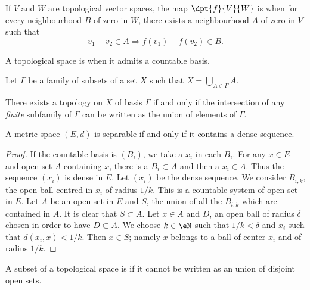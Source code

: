 \begin{definition}

	If $V$ and $W$ are topological vector spaces, the map $\dpt{f}{V}{W}$ is  when for every neighbourhood $B$ of zero in $W$, there exists a neighbourhood $A$ of zero in $V$ such that
	\[
		v_1-v_2\in A\Rightarrow f(v_1)-f(v_2)\in B.
	\]
	\label{def:unif_cont}
\end{definition}


\begin{definition}
	A topological space is  when it admits a countable basis.
\end{definition}

\begin{lemma}
	Let $\Gamma$ be a family of subsets of a set $X$ such that $X=\bigcup_{A\in\Gamma}A$.

	There exists a topology on $X$ of basis $\Gamma$ if and only if the intersection of any \emph{finite} subfamily of $\Gamma$ can be written as the union of elements of $\Gamma$.
	\label{lem:topo_base}
\end{lemma}

\begin{lemma}
	A metric space $(E,d)$ is separable if and only if it contains a dense sequence.
	\label{lem:sep_metric}
\end{lemma}

\begin{proof}
	 If the countable basis is $(B_i)$, we take a $x_i$ in each $B_i$. For any $x\in E$ and open set $A$ containing $x$, there is a $B_i\subset A$ and then a $x_i\in A$. Thus the sequence $(x_i)$ is dense in $E$.
	Let $(x_i)$ be the dense sequence. We consider $B_{i,k}$, the open ball centred in $x_i$ of radius $1/k$. This is a countable system of open set in $E$. Let $A$ be an open set in $E$ and $S$, the union of all the $B_{i,k}$ which are contained in $A$. It is clear that $S\subset A$. Let $x\in A$ and $D$, an open ball of radius $\delta$ chosen in order to have $D\subset A$. We choose $k\in\eN$ such that $1/k<\delta$ and $x_i$ such that $d(x_i,x)<1/k$. Then $x\in S$; namely $x$ belongs to a ball of center $x_i$ and of radius $1/k$.
\end{proof}

\begin{definition}
	A subset of a topological space is  if it cannot be written as an union of disjoint open sets.
\end{definition}

